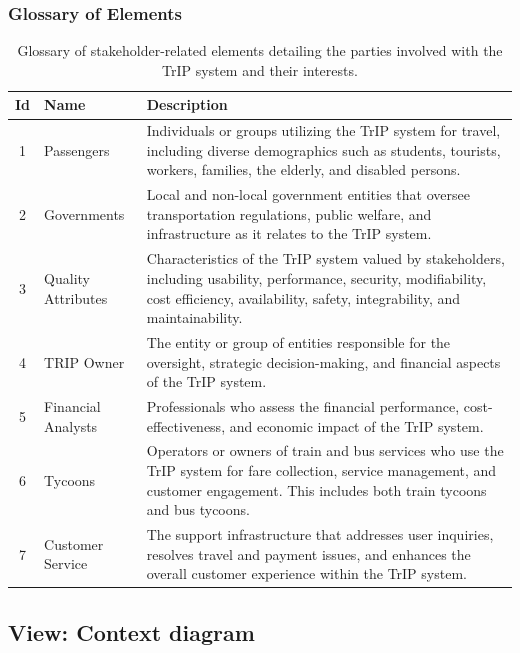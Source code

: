 \subsubsection{Glossary of Elements}
\begin{table}[H]
    \centering
    \begin{tabular}{@{}clp{9cm}@{}}
    \toprule
    \textbf{Id} & \textbf{Name} & \textbf{Description} \\
    \midrule
    1 & Passengers & Individuals or groups utilizing the TrIP system for travel, including diverse demographics such as students, tourists, workers, families, the elderly, and disabled persons. \\
    2 & Governments & Local and non-local government entities that oversee transportation regulations, public welfare, and infrastructure as it relates to the TrIP system. \\
    3 & Quality Attributes & Characteristics of the TrIP system valued by stakeholders, including usability, performance, security, modifiability, cost efficiency, availability, safety, integrability, and maintainability. \\
    4 & TRIP Owner & The entity or group of entities responsible for the oversight, strategic decision-making, and financial aspects of the TrIP system. \\
    5 & Financial Analysts & Professionals who assess the financial performance, cost-effectiveness, and economic impact of the TrIP system. \\
    6 & Tycoons & Operators or owners of train and bus services who use the TrIP system for fare collection, service management, and customer engagement. This includes both train tycoons and bus tycoons. \\
    7 & Customer Service & The support infrastructure that addresses user inquiries, resolves travel and payment issues, and enhances the overall customer experience within the TrIP system. \\
    \bottomrule
    \end{tabular}
    \caption{Glossary of stakeholder-related elements detailing the parties involved with the TrIP system and their interests.}
    \label{tab:glossary_stakeholder_view}
\end{table}


\subsection{View: Context diagram}
